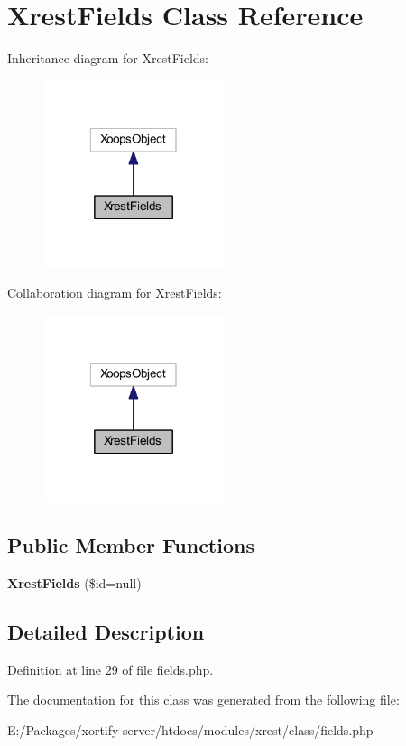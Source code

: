 \hypertarget{class_xrest_fields}{\section{Xrest\-Fields Class Reference}
\label{class_xrest_fields}
}


Inheritance diagram for Xrest\-Fields\-:
\nopagebreak
\begin{figure}[H]
\begin{center}
\leavevmode
\includegraphics[width=150pt]{class_xrest_fields__inherit__graph}
\end{center}
\end{figure}


Collaboration diagram for Xrest\-Fields\-:
\nopagebreak
\begin{figure}[H]
\begin{center}
\leavevmode
\includegraphics[width=150pt]{class_xrest_fields__coll__graph}
\end{center}
\end{figure}
\subsection*{Public Member Functions}
\begin{DoxyCompactItemize}
\item 
\hypertarget{class_xrest_fields_a58607170d897d86a8cb57858dcfc130b}{{\bfseries Xrest\-Fields} (\$id=null)}\label{class_xrest_fields_a58607170d897d86a8cb57858dcfc130b}

\end{DoxyCompactItemize}


\subsection{Detailed Description}


Definition at line 29 of file fields.\-php.



The documentation for this class was generated from the following file\-:\begin{DoxyCompactItemize}
\item 
E\-:/\-Packages/xortify server/htdocs/modules/xrest/class/fields.\-php\end{DoxyCompactItemize}
